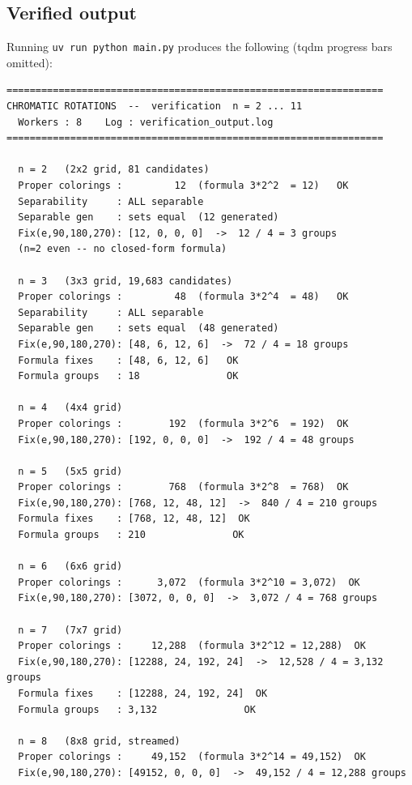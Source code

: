 \documentclass{article}
\begin{document}
\subsection{Verified output}

Running \texttt{uv run python main.py} produces the following
(tqdm progress bars omitted):

\begin{lstlisting}[language={},
  basicstyle=\scriptsize\ttfamily,
  backgroundcolor=\color{codebg},
  frame=single,
  numbers=none,
  caption={Complete verification output (n = 2--11).},
  label={lst:output}]
=================================================================
CHROMATIC ROTATIONS  --  verification  n = 2 ... 11
  Workers : 8    Log : verification_output.log
=================================================================

  n = 2   (2x2 grid, 81 candidates)
  Proper colorings :         12  (formula 3*2^2  = 12)   OK
  Separability     : ALL separable
  Separable gen    : sets equal  (12 generated)
  Fix(e,90,180,270): [12, 0, 0, 0]  ->  12 / 4 = 3 groups
  (n=2 even -- no closed-form formula)

  n = 3   (3x3 grid, 19,683 candidates)
  Proper colorings :         48  (formula 3*2^4  = 48)   OK
  Separability     : ALL separable
  Separable gen    : sets equal  (48 generated)
  Fix(e,90,180,270): [48, 6, 12, 6]  ->  72 / 4 = 18 groups
  Formula fixes    : [48, 6, 12, 6]   OK
  Formula groups   : 18               OK

  n = 4   (4x4 grid)
  Proper colorings :        192  (formula 3*2^6  = 192)  OK
  Fix(e,90,180,270): [192, 0, 0, 0]  ->  192 / 4 = 48 groups

  n = 5   (5x5 grid)
  Proper colorings :        768  (formula 3*2^8  = 768)  OK
  Fix(e,90,180,270): [768, 12, 48, 12]  ->  840 / 4 = 210 groups
  Formula fixes    : [768, 12, 48, 12]  OK
  Formula groups   : 210               OK

  n = 6   (6x6 grid)
  Proper colorings :      3,072  (formula 3*2^10 = 3,072)  OK
  Fix(e,90,180,270): [3072, 0, 0, 0]  ->  3,072 / 4 = 768 groups

  n = 7   (7x7 grid)
  Proper colorings :     12,288  (formula 3*2^12 = 12,288)  OK
  Fix(e,90,180,270): [12288, 24, 192, 24]  ->  12,528 / 4 = 3,132 groups
  Formula fixes    : [12288, 24, 192, 24]  OK
  Formula groups   : 3,132               OK

  n = 8   (8x8 grid, streamed)
  Proper colorings :     49,152  (formula 3*2^14 = 49,152)  OK
  Fix(e,90,180,270): [49152, 0, 0, 0]  ->  49,152 / 4 = 12,288 groups


\end{lstlisting}
\end{document}
